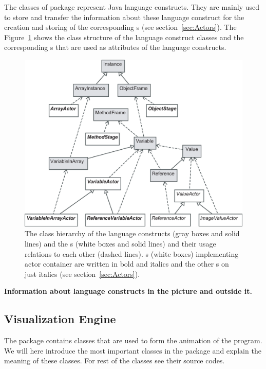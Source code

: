 The classes of  package represent Java language constructs. They are mainly used to store and transfer the information about these language construct for the creation and storing of the corresponding s (see section~\ref{sec:Actors}). The Figure~\ref{fig:language_constructs_and_actors} shows the class structure of the language construct classes and the corresponding s that are used as attributes of the language constructs.

\begin{figure}[!htb]
\begin{center}
\includegraphics[width=\textwidth]{images/language_constructs_and_actors.eps}
\caption{The class hierarchy of the language constructs (gray boxes and solid lines) and the s (white boxes and solid lines) and their usage relations to each other (dashed lines). s (white boxes) implementing actor container are written in bold and italics and the other s on just italics (see section~\ref{sec:Actors}).}
\label{fig:language_constructs_and_actors}
\end{center}
\end{figure}

{\bf Information about language constructs in the picture and outside it.}

\subsection{Visualization Engine}
\label{sec:Visualization_Engine}

The package  contains classes that are used to form the animation of the program. We will here introduce the most important classes in the package and explain the meaning of these classes. For rest of the classes see their source codes.

